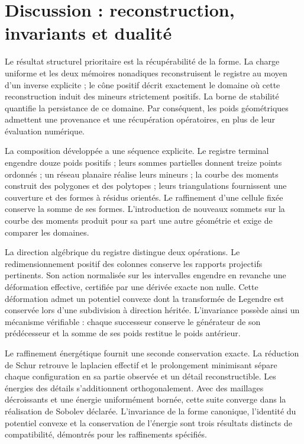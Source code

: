 \documentclass[a4paper,10pt]{article}
\theoremstyle{definition}\newtheorem{definition}[theorem]{Définition}
\theoremstyle{remark}\newtheorem{remark}[theorem]{Remarque}
\numberwithin{equation}{section}
\begin{document}
\section{Discussion : reconstruction, invariants et dualité}
\label{sec:discussion}
Le résultat structurel prioritaire est la récupérabilité de la forme.
La charge uniforme et les deux mémoires nonadiques reconstruisent le registre
au moyen d’un inverse explicite ; le cône positif décrit exactement
le domaine où cette reconstruction induit des mineurs strictement positifs.
La borne de stabilité quantifie la persistance de ce domaine. Par
conséquent, les poids géométriques admettent une provenance et une récupération
opératoires, en plus de leur évaluation numérique.

La composition développée a une séquence explicite. Le registre
terminal engendre douze poids positifs ; leurs sommes partielles donnent treize points
ordonnés ; un réseau planaire réalise leurs mineurs ; la courbe des moments
construit des polygones et des polytopes ; leurs triangulations fournissent une couverture
et des formes à résidus orientés. Le raffinement d’une cellule fixée conserve
la somme de ses formes. L’introduction de nouveaux sommets sur la courbe des
moments produit pour sa part une autre géométrie et exige de comparer les domaines.

La direction algébrique du registre distingue deux opérations. Le redimensionnement positif des colonnes conserve les rapports projectifs pertinents. Son action normalisée sur les intervalles engendre en revanche une déformation effective, certifiée par une dérivée exacte non nulle. Cette déformation admet un potentiel convexe dont la transformée de Legendre est conservée lors d'une subdivision à direction héritée. L'invariance possède ainsi un mécanisme vérifiable : chaque successeur conserve le générateur de son prédécesseur et la somme de ses poids restitue le poids antérieur.

Le raffinement énergétique fournit une seconde conservation exacte.
La réduction de Schur retrouve le laplacien effectif et le prolongement
minimisant sépare chaque configuration en sa partie observée et un détail
reconstructible. Les énergies des détails s’additionnent orthogonalement.
Avec des maillages décroissants et une énergie uniformément bornée, cette suite
converge dans la réalisation de Sobolev déclarée. L’invariance de la
forme canonique, l’identité du potentiel convexe et la conservation de
l’énergie sont trois résultats distincts de compatibilité, démontrés
pour les raffinements spécifiés.
\end{document}
